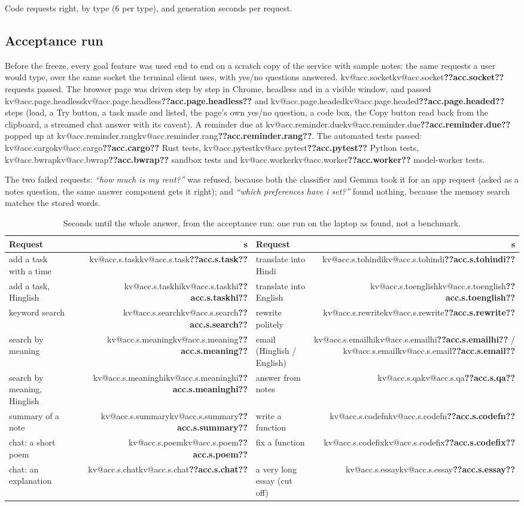 \documentclass[11pt,a4paper]{article}
\makeatletter
\DeclareRobustCommand{\kv}[1]{\ifcsname kv@#1\endcsname\csname kv@#1\endcsname\else\textbf{??#1??}\fi}
\newcommand{\req}[1]{\textit{``#1''}}
\makeatother
\begin{document}
\begin{table}[h]
\centering\small
\caption{Code requests right, by type (6 per type), and generation seconds per request.}
\label{tab:code}
\resizebox{\textwidth}{!}{}
\end{table}

\subsection{Acceptance run}\label{sec:acceptance}
Before the freeze, every goal feature was used end to end on a scratch copy of the service with sample notes: the same
requests a user would type, over the same socket the terminal client uses, with yes/no questions answered.
\kv{acc.socket} requests passed. The browser page was driven step by step in Chrome, headless and in a visible window,
and passed \kv{acc.page.headless} and \kv{acc.page.headed} steps (load, a Try button, a task made and listed, the page's
own yes/no question, a code box, the Copy button read back from the clipboard, a streamed chat answer with its caveat).
A reminder due at \kv{acc.reminder.due} popped up at \kv{acc.reminder.rang}. The automated tests passed: \kv{acc.cargo}
Rust tests, \kv{acc.pytest} Python tests, \kv{acc.bwrap} sandbox tests and \kv{acc.worker} model-worker tests.

The two failed requests: \req{how much is my rent?} was refused, because both the classifier and Gemma took it for an
app request (asked as a notes question, the same answer component gets it right); and \req{which preferences have i
set?} found nothing, because the memory search matches the stored words.

\begin{table}[h]
\centering\small
\caption{Seconds until the whole answer, from the acceptance run: one run on the laptop as found, not a
benchmark.}
\label{tab:times}
\begin{tabular}{lr@{\hspace{2.2em}}lr}
\toprule
Request & s & Request & s \\
\midrule
add a task with a time & \kv{acc.s.task} & translate into Hindi & \kv{acc.s.tohindi} \\
add a task, Hinglish & \kv{acc.s.taskhi} & translate into English & \kv{acc.s.toenglish} \\
keyword search & \kv{acc.s.search} & rewrite politely & \kv{acc.s.rewrite} \\
search by meaning & \kv{acc.s.meaning} & email (Hinglish / English) & \kv{acc.s.emailhi} / \kv{acc.s.email} \\
search by meaning, Hinglish & \kv{acc.s.meaninghi} & answer from notes & \kv{acc.s.qa} \\
summary of a note & \kv{acc.s.summary} & write a function & \kv{acc.s.codefn} \\
chat: a short poem & \kv{acc.s.poem} & fix a function & \kv{acc.s.codefix} \\
chat: an explanation & \kv{acc.s.chat} & a very long essay (cut off) & \kv{acc.s.essay} \\
\bottomrule
\end{tabular}
\end{table}
\end{document}
